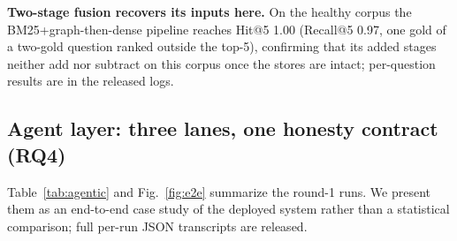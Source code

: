 \documentclass[preprint,12pt]{elsarticle}
\begin{document}
\textbf{Two-stage fusion recovers its inputs here.} On the healthy corpus
the BM25+graph-then-dense pipeline reaches Hit@5 1.00 (Recall@5 0.97, one gold of a two-gold question ranked
outside the top-5), confirming that its added stages
 neither add nor subtract on this corpus once the stores are intact;
per-question results are in the released logs.

\subsection{Agent layer: three lanes, one honesty contract (RQ4)}
\label{sec:agentic}

\begin{table}[!htbp]
\centering
\small
\caption{Agentic end-to-end runs, round 1: four questions $\times$ four
arms through the public chat API (engine \texttt{omp} over GLM-5.3-Flash,
20-turn budget; the full grid is run twice, see text). ``Cite'' = the
answer names the gold document;
``Facts'' = ground-truth fact markers contained / available. The bare
arm's sporadic marker matches are coincidental: it cites no source, and
its answers typically disclaim figures as unverified parametric recall.}
\label{tab:agentic}

\end{table}

Table~\ref{tab:agentic} and Fig.~\ref{fig:e2e} summarize the round-1 runs.
We present them as an end-to-end case study of the deployed system rather
than a statistical comparison; full per-run JSON transcripts are released.
\end{document}

